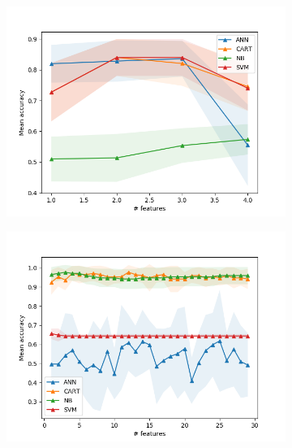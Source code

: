 \begin{figure}[htbp]
  \centering
  \begin{subfigure}[b]{0.475\textwidth}
      \centering
      \includegraphics[width=\textwidth]{../plots_with_std_fill/Cleaned_data_entropy_combined.png}
      \caption[Network2]%
      {{\small }}
      \label{fig:EN_entropy}
  \end{subfigure}
  \hfill
  \begin{subfigure}[b]{0.475\textwidth}
      \centering
      \includegraphics[width=\textwidth]{../plots_with_std_fill/data_FNA_entropy_combined.png}
      \caption[]%
      {{\small}}
      \label{fig:WBCD_entropy}
  \end{subfigure}


\end{figure}
